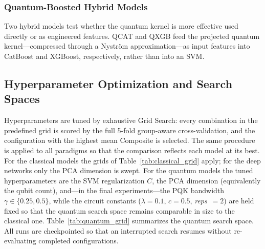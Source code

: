 \documentclass{ieeeaccess}
\begin{document}
\subsubsection{Quantum-Boosted Hybrid Models}
Two hybrid models test whether the quantum kernel is more effective used directly or as engineered features. QCAT and QXGB feed the projected quantum kernel---compressed through a Nystr\"om approximation---as input features into CatBoost and XGBoost, respectively, rather than into an SVM.

\subsection{Hyperparameter Optimization and Search Spaces}
\label{subsec:hpo}

Hyperparameters are tuned by exhaustive Grid Search: every combination in the predefined grid is scored by the full 5-fold group-aware cross-validation, and the configuration with the highest mean Composite is selected. The same procedure is applied to all paradigms so that the comparison reflects each model at its best. For the classical models the grids of Table~\ref{tab:classical_grid} apply; for the deep networks only the PCA dimension is swept. For the quantum models the tuned hyperparameters are the SVM regularization $C$, the PCA dimension (equivalently the qubit count), and---in the final experiments---the PQK bandwidth $\gamma\in\{0.25,0.5\}$, while the circuit constants ($\lambda=0.1$, $c=0.5$, \textit{reps}~$=2$) are held fixed so that the quantum search space remains comparable in size to the classical one. Table~\ref{tab:quantum_grid} summarizes the quantum search space. All runs are checkpointed so that an interrupted search resumes without re-evaluating completed configurations.
\end{document}
